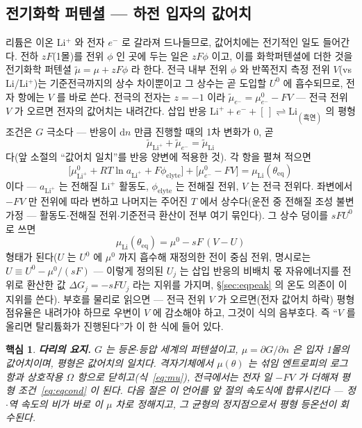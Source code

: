 \documentclass[11pt,a4paper]{article}
\newtheorem*{keybox}{핵심}
\newcommand{\dd}{\mathrm{d}}
\newcommand{\eq}{\mathrm{eq}}
\begin{document}
\subsection{전기화학 퍼텐셜 — 하전 입자의 값어치}
리튬은 이온 Li$^+$ 와 전자 $e^-$ 로 갈라져 드나들므로, 값어치에는 전기적인 일도 들어간다. 전하 $zF$(1몰)를
전위 $\phi$ 인 곳에 두는 일은 $zF\phi$ 이고, 이를 화학퍼텐셜에 더한 것을 전기화학 퍼텐셜
$\tilde\mu=\mu+zF\phi$ 라 한다. 전극 내부 전위 $\phi$ 와 반쪽전지 측정 전위 $V$(vs Li/Li$^+$)는
기준전극까지의 상수 차이뿐이고 그 상수는 곧 도입할 $U^0$ 에 흡수되므로, 전자 항에는 $V$ 를 바로 쓴다.
전극의 전자는 $z=-1$ 이라 $\tilde\mu_{e^-}=\mu_{e^-}^0-FV$ — 전극 전위 $V$ 가 오르면 전자의
값어치는 내려간다. 삽입 반응
$\mathrm{Li}^++e^-+[\,]\rightleftharpoons\mathrm{Li}_{(\text{흑연})}$ 의 평형 조건은 $G$ 극소다 —
반응이 $\dd n$ 만큼 진행할 때의 1차 변화가 $0$, 곧
\begin{equation}
\tilde\mu_{\mathrm{Li}^+}+\tilde\mu_{e^-}=\tilde\mu_{\mathrm{Li}}
\label{eq:eqbalance}
\end{equation}
다(앞 소절의 ``값어치 일치''를 반응 양변에 적용한 것). 각 항을 펼쳐 적으면
\begin{equation}
\big[\mu^0_{\mathrm{Li}^+}+RT\ln a_{\mathrm{Li}^+}+F\phi_{\mathrm{elyte}}\big]
+\big[\mu^0_{e^-}-FV\big]
=\mu_{\mathrm{Li}}(\theta_{\eq})
\label{eq:eqexpand}
\end{equation}
이다 — $a_{\mathrm{Li}^+}$ 는 전해질 Li$^+$ 활동도, $\phi_{\mathrm{elyte}}$ 는 전해질 전위, $V$ 는
전극 전위다. 좌변에서 $-FV$ 만 전위에 따라 변하고 나머지는 주어진 $T$ 에서 상수다(운전 중 전해질 조성
불변 가정 — 활동도$\cdot$전해질 전위$\cdot$기준전극 환산이 전부 여기 묶인다). 그 상수 덩이를
$sFU^0$ 로 쓰면
\begin{equation}
\mu_{\mathrm{Li}}(\theta_{\eq})=\mu^0-sF\,(V-U)
\label{eq:eqcond}
\end{equation}
형태가 된다($U$ 는 $U^0$ 에 $\mu^0$ 까지 흡수해 재정의한 전이 중심 전위, 명시로는
$U\equiv U^0-\mu^0/(sF)$ — 이렇게 정의된 $U_j$ 는
삽입 반응의 비배치 몫 자유에너지를 전위로 환산한 값 $\Delta G_j=-sFU_j$ 라는 지위를 가지며,
\S\ref{sec:eqpeak} 의 온도 의존이 이 지위를 쓴다). 부호를 물리로 읽으면 — 전극 전위 $V$ 가
오르면(전자 값어치 하락) 평형 점유율은 내려가야 하므로 우변이 $V$ 에 감소해야 하고, 그것이 식의 음부호다.
즉 ``$V$ 를 올리면 탈리튬화가 진행된다''가 이 한 식에 들어 있다.

\begin{keybox}
\textbf{다리의 요지.} $G$ 는 등온$\cdot$등압 세계의 퍼텐셜이고, $\mu=\partial G/\partial n$ 은 입자
1몰의 값어치이며, 평형은 값어치의 일치다. 격자기체에서 $\mu(\theta)$ 는 섞임 엔트로피의 로그 항과 상호작용
$\Omega$ 항으로 닫히고(식~\eqref{eq:mu}), 전극에서는 전자 일 $-FV$ 가 더해져 평형 조건~\eqref{eq:eqcond}
이 된다. 다음 절은 이 언어를 앞 절의 속도식에 합류시킨다 — 정$\cdot$역 속도의 비가 바로 이 $\mu$ 차로
정해지고, 그 균형의 정지점으로서 평형 등온선이 \emph{회수된다}.
\end{keybox}
\end{document}
